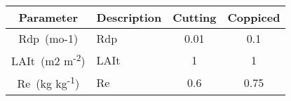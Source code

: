 \begin{tabularx}{\linewidth}{|cXcc|}
  \hline
  Parameter & Description & Cutting & Coppiced\\
\hline
\acs{Rdp}~(mo-1) & \acf{Rdp} & 0.01 & 0.1\\
\ac{LAIt}~(m2 m\textsuperscript{-2}) & \acf{LAIt} & 1 & 1\\
\acs{Re}~(kg kg\textsuperscript{-1}) & \acf{Re} & 0.6 & 0.75\\
\hline
\end{tabularx}

